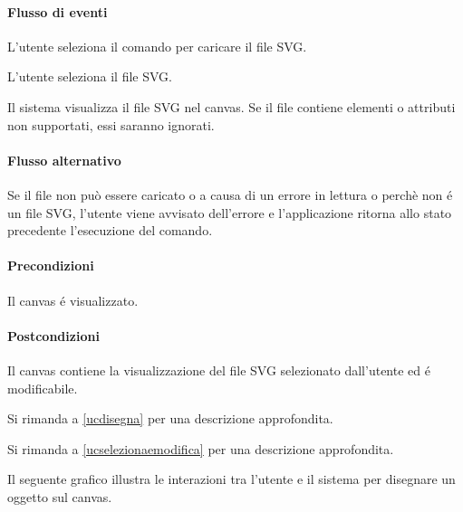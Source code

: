 \paragraph{Flusso di eventi}
\begin{elenconumerato}[\textbf{}]{\subsubsecindent}
\item L'utente seleziona il comando per caricare il file SVG.
\item L'utente seleziona il file SVG.
\item Il sistema visualizza il file SVG nel canvas. Se il file contiene elementi o attributi non supportati, essi saranno ignorati.
\end{elenconumerato}
\paragraph{Flusso alternativo}
Se il file non pu\`o essere caricato o a causa di un errore in lettura o perch\`e non \'e un file SVG, l'utente viene avvisato dell'errore e l'applicazione ritorna allo stato precedente l'esecuzione del comando.
\paragraph{Precondizioni} Il canvas \'e visualizzato.
\paragraph{Postcondizioni} Il canvas contiene la visualizzazione del file SVG selezionato dall'utente ed \'e modificabile.

Si rimanda a \ref{ucdisegna} per una descrizione approfondita.

Si rimanda a \ref{ucselezionaemodifica} per una descrizione approfondita.

\label{ucdisegna}
Il seguente grafico illustra le interazioni tra l'utente e il sistema per disegnare un oggetto sul canvas.

